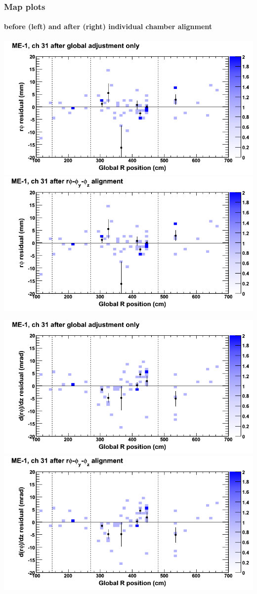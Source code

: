 \documentclass[compress]{beamer}
\begin{document}
\begin{frame}
\frametitle{Map plots}
\framesubtitle{before (left) and after (right) individual chamber alignment}
\includegraphics[width=0.5\linewidth]{ringmapplots_3dof/before_CSCvsr_mem1ch31_x.png} \includegraphics[width=0.5\linewidth]{ringmapplots_3dof/after_CSCvsr_mem1ch31_x.png}

\includegraphics[width=0.5\linewidth]{ringmapplots_3dof/before_CSCvsr_mem1ch31_dxdz.png} \includegraphics[width=0.5\linewidth]{ringmapplots_3dof/after_CSCvsr_mem1ch31_dxdz.png}
\end{frame}
\end{document}
